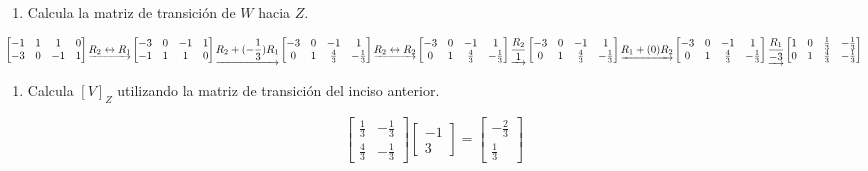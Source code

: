 \documentclass[
  11,
]{article}
\providecommand{\tightlist}{%
  \setlength{\itemsep}{0pt}\setlength{\parskip}{0pt}}
\begin{document}
\begin{enumerate}
\def\labelenumi{\alph{enumi})}
\setcounter{enumi}{1}
\tightlist
\item
  Calcula la matriz de transición de \(W\) hacia \(Z\).
\end{enumerate}

\[
  \left[\begin{matrix}-1 & 1 & 1 & 0\\-3 & 0 & -1 & 1\end{matrix}\right]
\underrightarrow{ R_{2} \leftrightarrow R_{1} }
\left[\begin{matrix}-3 & 0 & -1 & 1\\-1 & 1 & 1 & 0\end{matrix}\right]
\underrightarrow{ R_2 + (- \frac{1}{3})R_1 }
\left[\begin{matrix}-3 & 0 & -1 & 1\\0 & 1 & \frac{4}{3} & - \frac{1}{3}\end{matrix}\right]
\underrightarrow{ R_{2} \leftrightarrow R_{2} }
\left[\begin{matrix}-3 & 0 & -1 & 1\\0 & 1 & \frac{4}{3} & - \frac{1}{3}\end{matrix}\right]
\underrightarrow{ \frac{R_2}{1} }
\left[\begin{matrix}-3 & 0 & -1 & 1\\0 & 1 & \frac{4}{3} & - \frac{1}{3}\end{matrix}\right]
\underrightarrow{ R_1 + (0)R_2 }
\\
\left[\begin{matrix}-3 & 0 & -1 & 1\\0 & 1 & \frac{4}{3} & - \frac{1}{3}\end{matrix}\right]
\underrightarrow{ \frac{R_1}{-3} }
\left[\begin{matrix}1 & 0 & \frac{1}{3} & - \frac{1}{3}\\0 & 1 & \frac{4}{3} & - \frac{1}{3}\end{matrix}\right]
\]

\begin{enumerate}
\def\labelenumi{\alph{enumi})}
\setcounter{enumi}{2}
\tightlist
\item
  Calcula \([V]_Z\) utilizando la matriz de transición del inciso
  anterior.
\end{enumerate}

\[
  \left[\begin{matrix}\frac{1}{3} & - \frac{1}{3}\\\frac{4}{3} & - \frac{1}{3}\end{matrix}\right] \left[\begin{matrix}-1 \\ 3\end{matrix}\right] = \left[\begin{matrix}-\frac{2}{3} \\ \frac{1}{3}\end{matrix}\right]
  \]
\end{document}

